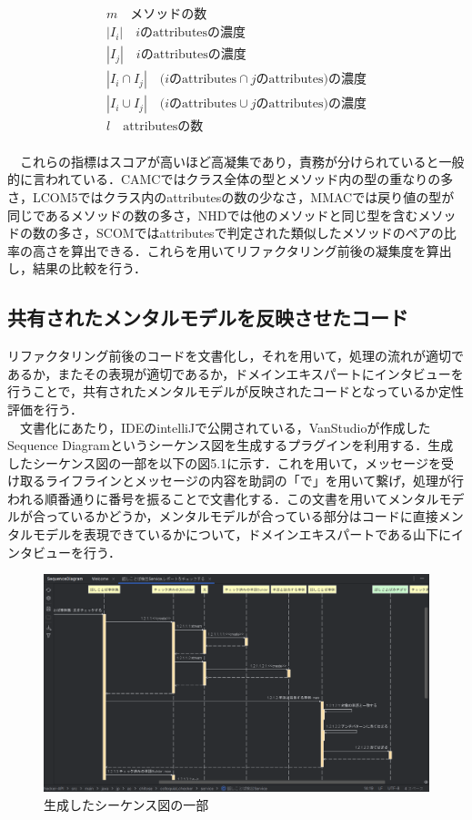 \documentclass[12pt, a4paper]{jreport}
\begin{document}
\begin{gather*}
m\text{　メソッドの数}
\\|{I}_{i}|\text{　}i\text{のattributesの濃度}
\\|{I}_{j}|\text{　}i\text{のattributesの濃度}
\\|{I}_{i}\cap{I}_{j}|\text{　}(i\text{のattributes}\cap j\text{のattributes)の濃度}
\\|{I}_{i}\cup{I}_{j}|\text{　}(i\text{のattributes}\cup j\text{のattributes)の濃度}
\\l\text{　attributesの数}
\end{gather*}
\\　これらの指標はスコアが高いほど高凝集であり，責務が分けられていると一般的に言われている．CAMCではクラス全体の型とメソッド内の型の重なりの多さ，LCOM5ではクラス内のattributesの数の少なさ，MMACでは戻り値の型が同じであるメソッドの数の多さ，NHDでは他のメソッドと同じ型を含むメソッドの数の多さ，SCOMではattributesで判定された類似したメソッドのペアの比率の高さを算出できる．これらを用いてリファクタリング前後の凝集度を算出し，結果の比較を行う．
\subsection{共有されたメンタルモデルを反映させたコード}
リファクタリング前後のコードを文書化し，それを用いて，処理の流れが適切であるか，またその表現が適切であるか，ドメインエキスパートにインタビューを行うことで，共有されたメンタルモデルが反映されたコードとなっているか定性評価を行う．
\\　文書化にあたり，IDEのintelliJで公開されている，VanStudioが作成したSequence Diagram\cite{sequence}というシーケンス図を生成するプラグインを利用する．生成したシーケンス図の一部を以下の図5.1に示す．これを用いて，メッセージを受け取るライフラインとメッセージの内容を助詞の「で」を用いて繋げ，処理が行われる順番通りに番号を振ることで文書化する．この文書を用いてメンタルモデルが合っているかどうか，メンタルモデルが合っている部分はコードに直接メンタルモデルを表現できているかについて，ドメインエキスパートである山下にインタビューを行う．
\begin{figure}[H]
\centering
\includegraphics[width=1\linewidth]{image/sequence.png}
\caption{生成したシーケンス図の一部}
\label{fig:enter-label}
\end{figure}
\end{document}

